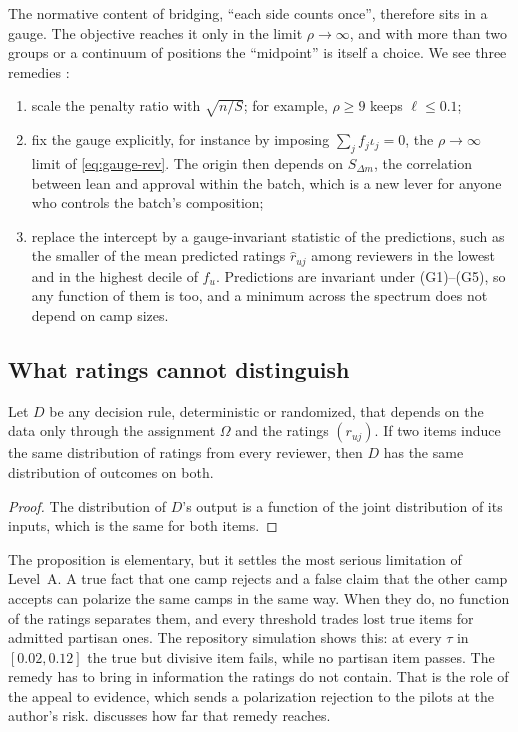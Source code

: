 The normative content of bridging, ``each side counts once'', therefore sits in a gauge. The
objective reaches it only in the limit $\rho\to\infty$, and with more than two groups or a
continuum of positions the ``midpoint'' is itself a choice. We see three remedies
\openq:
\begin{enumerate}[label=(\alph*)]
  \item scale the penalty ratio with $\sqrt{n/S}$; for example, $\rho\ge9$ keeps $\ell\le0.1$;
  \item fix the gauge explicitly, for instance by imposing $\sum_jf_j\iota_j=0$, the
    $\rho\to\infty$ limit of \eqref{eq:gauge-rev}. The origin then depends on $S_{\Delta m}$, the
    correlation between lean and approval within the batch, which is a new lever for anyone
    who controls the batch's composition;
  \item replace the intercept by a gauge-invariant statistic of the predictions, such as the
    smaller of the mean predicted ratings $\hat r_{uj}$ among reviewers in the lowest and in the
    highest decile of $f_u$. Predictions are invariant under (G1)--(G5), so any function of
    them is too, and a minimum across the spectrum does not depend on camp sizes.
\end{enumerate}

\subsection{What ratings cannot distinguish}

\begin{proposition}\label{prop:equivalence}\proved{}
Let $D$ be any decision rule, deterministic or randomized, that depends on the data only
through the assignment $\Omega$ and the ratings $(r_{uj})$. If two items induce the same
distribution of ratings from every reviewer, then $D$ has the same distribution of outcomes on
both.
\end{proposition}
\begin{proof}
The distribution of $D$'s output is a function of the joint distribution of its inputs, which is
the same for both items.
\end{proof}

The proposition is elementary, but it settles the most serious limitation of Level~A. A true
fact that one camp rejects and a false claim that the other camp accepts can polarize the same
camps in the same way. When they do, no function of the ratings separates them, and every
threshold trades lost true items for admitted partisan ones. The repository simulation shows
this: at every $\tau$ in $[0.02,0.12]$ the true but divisive item fails, while no partisan item
passes. The remedy has to bring in information the ratings do not contain. That is the role of
the appeal to evidence, which sends a polarization rejection to the pilots at the author's risk.
 discusses how far that remedy reaches.

